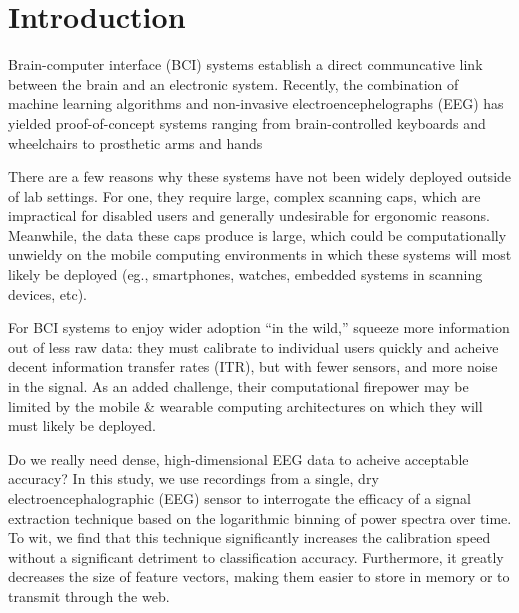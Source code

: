 \section{Introduction}


Brain-computer interface (BCI) systems establish a direct communcative link between the brain and an electronic system. \cite{dornhege_toward_2007,mcfarland_brain-computer_2011} Recently, the combination of machine learning algorithms and non-invasive electroencephelographs (EEG) has yielded proof-of-concept systems ranging from brain-controlled keyboards and wheelchairs to prosthetic arms and hands \cite{blankertz_note_2007,millan_combining_2010,d._mattia_brain_2011,hill_practical_2014,campbell_neurophone:_2010}

There are a few reasons why these systems have not been widely deployed outside of lab settings. For one, they require large, complex scanning caps, which are impractical for disabled users and generally undesirable for ergonomic reasons. \cite{ekandem_evaluating_2012,leeb_transferring_2013} Meanwhile, the data these caps produce is large, which could be computationally unwieldy on the mobile computing environments in which these systems will most likely be deployed (eg., smartphones, watches, embedded systems in scanning devices, etc). 

For BCI systems to enjoy wider adoption ``in the wild,'' squeeze more information out of less raw data: they must calibrate to individual users quickly and acheive decent information transfer rates (ITR), but with fewer sensors, and more noise in the signal. As an added challenge, their computational firepower may be limited by the mobile \& wearable computing architectures on which they will must likely be deployed.

Do we really need dense, high-dimensional EEG data to acheive acceptable accuracy? In this study, we use recordings from a single, dry electroencephalographic (EEG) sensor to interrogate the efficacy of a signal extraction technique based on the logarithmic binning of power spectra over time. To wit, we find that this technique significantly increases the calibration speed without a significant detriment to classification accuracy. Furthermore, it greatly decreases the size of feature vectors, making them easier to store in memory or to transmit through the web.
